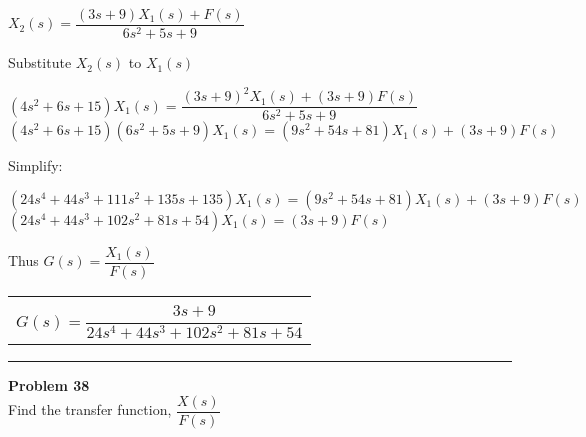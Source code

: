 \documentclass[11pt,letterpaper]{article}
\begin{document}
\begin{center}
	$X_2(s)=\dfrac{(3s+9)X_1(s)+F(s)}{6s^2+5s+9}$\\
\end{center}
Substitute $X_2(s)$ to $X_1(s)$\\
\begin{center}
	$(4s^2+6s+15)X_1(s)=\dfrac{(3s+9)^2X_1(s)+(3s+9)F(s)}{6s^2+5s+9}$\\[12pt]
	$(4s^2+6s+15)(6s^2+5s+9)X_1(s)=(9s^2+54s+81)X_1(s)+(3s+9)F(s)$\\
\end{center}
Simplify:\\
\begin{center}
	$(24s^4+44s^3+111s^2+135s+135)X_1(s)=(9s^2+54s+81)X_1(s)+(3s+9)F(s)$\\[12pt]
	$(24s^4+44s^3+102s^2+81s+54)X_1(s)=(3s+9)F(s)$\\
\end{center}
Thus $G(s)=\dfrac{X_1(s)}{F(s)}$\\
\begin{center}
	\begin{tabular}{|c|}
		\hline \\
		$G(s)=\dfrac{3s+9}{24s^4+44s^3+102s^2+81s+54}$	\\ [12pt]
	\hline
	\end{tabular}	
\end{center}

\clearpage

\rule{\textwidth}{1pt}
\textbf{Problem 38}\\
Find the transfer function, $\dfrac{X(s)}{F(s)}$ \\
\end{document}
